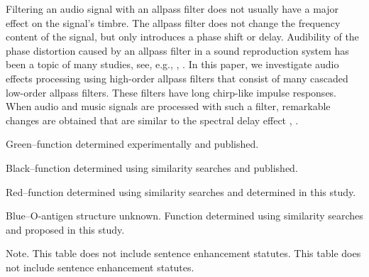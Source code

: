 \documentclass{aes2e}
\begin{document}
Filtering an audio signal with an allpass filter does not usually have a major effect on the signal's timbre. The allpass filter does not change the frequency content of the signal, but only introduces a phase shift or delay. Audibility of the phase distortion caused by an allpass filter in a sound reproduction system has been a topic of many studies, see, e.g., \cite{DEK1}, \cite{DEK2}. In this paper, we investigate audio effects processing using high-order allpass filters that consist of many cascaded low-order allpass filters. These filters have long chirp-like impulse responses. When audio and music signals are processed with such a filter, remarkable changes are obtained that are similar to the spectral delay effect  \cite{DEK3}, \cite{DEK4}.
\begin{arabiclist}
\item{}Green--function determined experimentally and published.
\item{}Black--function determined using similarity searches and published.
\item{}Red--function determined using similarity searches and determined in this study.
\item{}Blue--O-antigen structure unknown. Function determined using similarity searches and proposed in this study.
\end{arabiclist}

\begin{table}[t]
\begin{tabnote}
Note. This table does not include sentence enhancement statutes.  This table does not include sentence enhancement statutes.
\end{tabnote}
\end{table}
\end{document}
